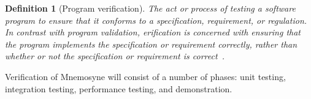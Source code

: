 \documentclass[11pt,a4paper]{article}
\theoremstyle{break}
\newtheorem{defn}{Definition}
\begin{document}
\begin{defn}[Program verification]
The act or process of testing a software program to ensure that it conforms to  a specification, requirement, or regulation. In contrast with \textit{program validation}, erification is concerned with ensuring that the program implements the specification or requirement correctly, rather than whether or not the specification or requirement is correct~\cite{London:2003:PV:1074100.1074730,5937011}.
\end{defn}


Verification of Mnemosyne will consist of a number of phases: unit testing, integration testing, performance testing, and demonstration.

%
%
%
\end{document}
